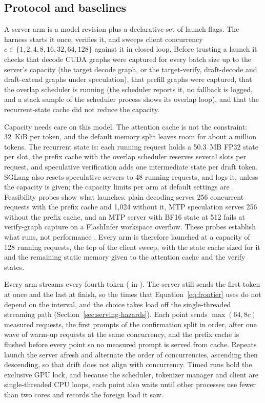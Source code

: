 \subsection{Protocol and baselines}\label{sec:serving-protocol}
A server arm is a model revision plus a declarative set of launch flags. The harness starts it once, verifies it, and sweeps client concurrency $c\in\{1,2,4,8,16,32,64,128\}$ against it in closed loop. Before trusting a launch it checks that decode CUDA graphs were captured for every batch size up to the server's capacity (the target decode graph, or the target-verify, draft-decode and draft-extend graphs under speculation), that prefill graphs were captured, that the overlap scheduler is running (the scheduler reports it, no fallback is logged, and a stack sample of the scheduler process shows its overlap loop), and that the recurrent-state cache did not reduce the capacity.

Capacity needs care on this model. The attention cache is not the constraint: 32~KiB per token, and the default memory split leaves room for about a million tokens. The recurrent state is: each running request holds a 50.3~MB FP32 state per slot, the prefix cache with the overlap scheduler reserves several slots per request, and speculative verification adds one intermediate state per draft token. SGLang also resets speculative servers to 48 running requests, and logs it, unless the capacity is given; the capacity limits per arm at default settings are . Feasibility probes show what launches: plain decoding serves 256 concurrent requests with the prefix cache and 1,024 without it, MTP speculation serves 256 without the prefix cache, and an MTP server with BF16 state at 512 fails at verify-graph capture on a FlashInfer workspace overflow. These probes establish what runs, not performance . Every arm is therefore launched at a capacity of 128 running requests, the top of the client sweep, with the state cache sized for it and the remaining static memory given to the attention cache and the verify states.

Every arm streams every fourth token ( in ). The server still sends the first token at once and the last at finish, so the times that Equation~\eqref{eq:frontier} uses do not depend on the interval, and the choice takes load off the single-threaded streaming path (Section~\ref{sec:serving-hazards}). Each point sends $\max(64,8c)$ measured requests, the first prompts of the confirmation split in order, after one wave of warm-up requests at the same concurrency, and the prefix cache is flushed before every point so no measured prompt is served from cache. Repeats launch the server afresh and alternate the order of concurrencies, ascending then descending, so that drift does not align with concurrency. Timed runs hold the exclusive GPU lock, and because the scheduler, tokenizer manager and client are single-threaded CPU loops, each point also waits until other processes use fewer than two cores and records the foreign load it saw.

